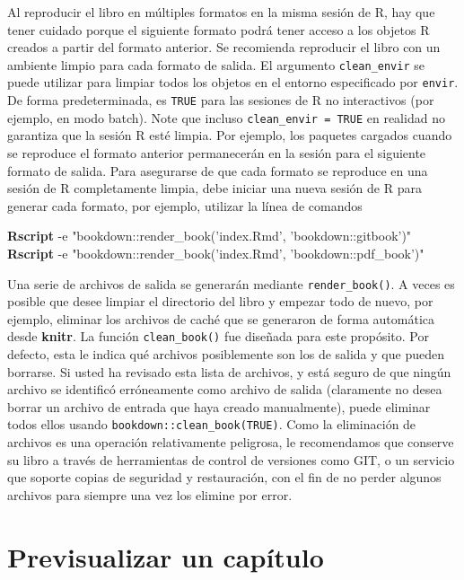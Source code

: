 \documentclass[12pt,]{krantz}
\makeatletter
\newenvironment{Shaded}{\begin{snugshade}}{\end{snugshade}}
\newcommand{\KeywordTok}[1]{\textcolor[rgb]{0.13,0.29,0.53}{\textbf{{#1}}}}
\newcommand{\StringTok}[1]{\textcolor[rgb]{0.31,0.60,0.02}{{#1}}}
\newcommand{\NormalTok}[1]{{#1}}
\newenvironment{kframe}{%
\medskip{}
\setlength{\fboxsep}{.8em}
 \def\at@end@of@kframe{}%
 \ifinner\ifhmode%
  \def\at@end@of@kframe{\end{minipage}}%
  \begin{minipage}{\columnwidth}%
 \fi\fi%
 \def\FrameCommand##1{\hskip\@totalleftmargin \hskip-\fboxsep
 \colorbox{shadecolor}{##1}\hskip-\fboxsep
     \hskip-\linewidth \hskip-\@totalleftmargin \hskip\columnwidth}%
 \MakeFramed {\advance\hsize-\width
   \@totalleftmargin\z@ \linewidth\hsize
   \@setminipage}}%
 {\par\unskip\endMakeFramed%
 \at@end@of@kframe}
\renewenvironment{Shaded}{\begin{kframe}}{\end{kframe}}
\theoremstyle{definition}
\theoremstyle{definition}
\theoremstyle{remark}
\makeatother
\begin{document}
Al reproducir el libro en múltiples formatos en la misma sesión de R,
hay que tener cuidado porque el siguiente formato podrá tener acceso a
los objetos R creados a partir del formato anterior. Se recomienda
reproducir el libro con un ambiente limpio para cada formato de salida.
El argumento \texttt{clean\_envir} se puede utilizar para limpiar todos
los objetos en el entorno especificado por \texttt{envir}. De forma
predeterminada, es \texttt{TRUE} para las sesiones de R no interactivos
(por ejemplo, en modo batch). Note que incluso
\texttt{clean\_envir\ =\ TRUE} en realidad no garantiza que la sesión R
esté limpia. Por ejemplo, los paquetes cargados cuando se reproduce el
formato anterior permanecerán en la sesión para el siguiente formato de
salida. Para asegurarse de que cada formato se reproduce en una sesión
de R completamente limpia, debe iniciar una nueva sesión de R para
generar cada formato, por ejemplo, utilizar la línea de comandos

\begin{Shaded}
\begin{Highlighting}[]
\KeywordTok{Rscript} \NormalTok{-e }\StringTok{"bookdown::render_book('index.Rmd', 'bookdown::gitbook')"}
\KeywordTok{Rscript} \NormalTok{-e }\StringTok{"bookdown::render_book('index.Rmd', 'bookdown::pdf_book')"}
\end{Highlighting}
\end{Shaded}

Una serie de archivos de salida se generarán mediante
\texttt{render\_book()}. A veces es posible que desee limpiar el
directorio del libro y empezar todo de nuevo, por ejemplo, eliminar los
archivos de caché que se generaron de forma automática desde
\textbf{knitr}. La función \texttt{clean\_book()} fue diseñada para este
propósito. Por defecto, esta le indica qué archivos posiblemente son los
de salida y que pueden borrarse. Si usted ha revisado esta lista de
archivos, y está seguro de que ningún archivo se identificó erróneamente
como archivo de salida (claramente no desea borrar un archivo de entrada
que haya creado manualmente), puede eliminar todos ellos usando
\texttt{bookdown::clean\_book(TRUE)}. Como la eliminación de archivos es
una operación relativamente peligrosa, le recomendamos que conserve su
libro a través de herramientas de control de versiones como GIT, o un
servicio que soporte copias de seguridad y restauración, con el fin de
no perder algunos archivos para siempre una vez los elimine por error.

\section{Previsualizar un capítulo}\label{previsualizar-un-capitulo}
\end{document}
